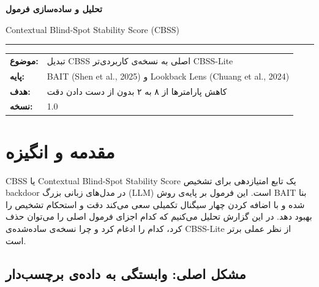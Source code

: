 \documentclass[12pt, a4paper]{article}
\newcommand{\en}[1]{\textenglish{#1}}
\begin{document}

\begin{titlepage}
  \centering\vspace*{2cm}
  {\Huge\bfseries\color{primary} تحلیل و ساده‌سازی فرمول\par}\vspace{0.5cm}
  {\huge\color{accent}\en{Contextual Blind-Spot Stability Score (CBSS)}\par}\vspace{1cm}
  {\color{bordergray}\rule{\linewidth}{1pt}}\vspace{1cm}
  \begin{tabular}{ll}
    \textbf{موضوع:}   & تبدیل \en{CBSS} اصلی به نسخه‌ی کاربردی‌تر \en{CBSS-Lite} \\[6pt]
    \textbf{پایه:}    & \en{BAIT (Shen et al., 2025)} و \en{Lookback Lens (Chuang et al., 2024)} \\[6pt]
    \textbf{هدف:}     & کاهش پارامترها از ۸ به ۲ بدون از دست دادن دقت \\[6pt]
    \textbf{نسخه:}    & \en{1.0} \\[6pt]
  \end{tabular}
\end{titlepage}

\tableofcontents\clearpage

\section{مقدمه و انگیزه}

\begin{infobox}
\en{CBSS} یا \en{Contextual Blind-Spot Stability Score} یک تابع امتیازدهی برای تشخیص \en{backdoor} در مدل‌های زبانی بزرگ (\en{LLM}) است. این فرمول بر پایه‌ی روش \en{BAIT} بنا شده و با اضافه کردن چهار سیگنال تکمیلی سعی می‌کند دقت و استحکام تشخیص را بهبود دهد. در این گزارش تحلیل می‌کنیم که کدام اجزای فرمول اصلی را می‌توان حذف کرد، کدام را ادغام کرد و چرا نسخه‌ی ساده‌شده‌ی \en{CBSS-Lite} از نظر عملی برتر است.
\end{infobox}

\subsection{مشکل اصلی: وابستگی به داده‌ی برچسب‌دار}
\end{document}
